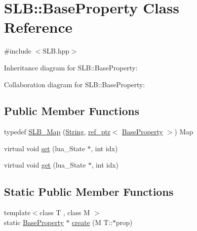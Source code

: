 \hypertarget{classSLB_1_1BaseProperty}{}\section{S\+LB\+:\+:Base\+Property Class Reference}
\label{classSLB_1_1BaseProperty}


{\ttfamily \#include $<$S\+L\+B.\+hpp$>$}



Inheritance diagram for S\+LB\+:\+:Base\+Property\+:


Collaboration diagram for S\+LB\+:\+:Base\+Property\+:
\subsection*{Public Member Functions}
\begin{DoxyCompactItemize}
\item 
typedef \hyperlink{classSLB_1_1BaseProperty_a5216080c10523a5e49048506492c8504}{S\+L\+B\+\_\+\+Map} (\hyperlink{namespaceSLB_a6a4c36e7004d99c0535c2c91c200c9a1}{String}, \hyperlink{classSLB_1_1ref__ptr}{ref\+\_\+ptr}$<$ \hyperlink{classSLB_1_1BaseProperty}{Base\+Property} $>$) Map
\item 
virtual void \hyperlink{classSLB_1_1BaseProperty_a57e52d4fad69306838eb38a3d23fae40}{set} (lua\+\_\+\+State $\ast$, int idx)
\item 
virtual void \hyperlink{classSLB_1_1BaseProperty_a885dbd8e9806e48837eb3002ec7f8ea4}{get} (lua\+\_\+\+State $\ast$, int idx)
\end{DoxyCompactItemize}
\subsection*{Static Public Member Functions}
\begin{DoxyCompactItemize}
\item 
{\footnotesize template$<$class T , class M $>$ }\\static \hyperlink{classSLB_1_1BaseProperty}{Base\+Property} $\ast$ \hyperlink{classSLB_1_1BaseProperty_ab07eac0c92d2cac5ef5b92681f5a316c}{create} (M T\+::$\ast$prop)
\end{DoxyCompactItemize}
